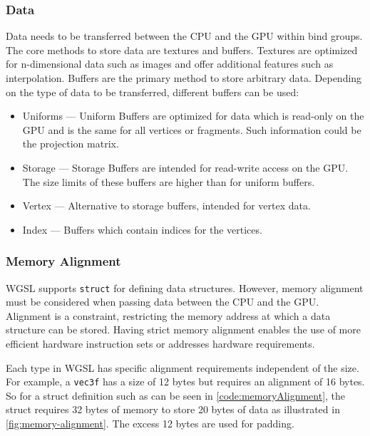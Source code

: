 \subsubsection{Data}

Data needs to be transferred between the \gls{CPU} and the \gls{GPU} within bind groups. The core methods to store data are textures and buffers. Textures are optimized for n-dimensional data such as images and offer additional features such as interpolation. Buffers are the primary method to store arbitrary data. Depending on the type of data to be transferred, different buffers can be used:

\begin{itemize}
  \item{Uniforms} — Uniform Buffers are optimized for data which is read-only on the \gls{GPU} and is the same for all vertices or fragments. Such information could be the projection matrix.
  \item{Storage} — Storage Buffers are intended for read-write access on the \gls{GPU}. The size limits of these buffers are higher than for uniform buffers.
  \item{Vertex} — Alternative to storage buffers, intended for vertex data.
  \item{Index} — Buffers which contain indices for the vertices.
\end{itemize}

\subsubsection{Memory Alignment}
\label{ch:memoryAlignmentTheory}

\gls{WGSL} supports \texttt{struct} for defining data structures. However, memory alignment must be considered when passing data between the \gls{CPU} and the \gls{GPU}. Alignment is a constraint, restricting the memory address at which a data structure can be stored. Having strict memory alignment enables the use of more efficient hardware instruction sets or addresses hardware requirements.

Each type in \gls{WGSL} has specific alignment requirements independent of the size. For example, a \texttt{vec3f} has a size of 12 bytes but requires an alignment of 16 bytes. So for a struct definition such as can be seen in \autoref{code:memoryAlignment}, the struct requires 32 bytes of memory to store 20 bytes of data as illustrated in \autoref{fig:memory-alignment}. The excess 12 bytes are used for padding.

